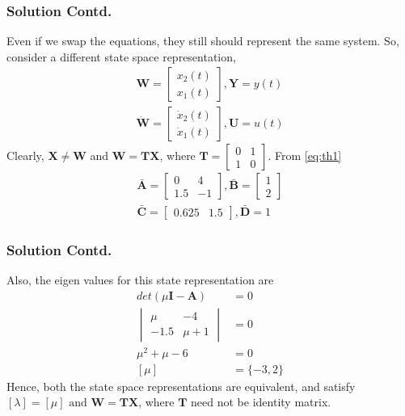 \documentclass{beamer}
\renewcommand{\vec}[1]{\mathbf{#1}}
\begin{document}
\begin{frame}
\frametitle{Solution Contd.}
Even if we swap the equations, they still should represent the same system. So, consider a different state space representation, 
\begin{align}
    \vec{W}=\begin{bmatrix}
    x_2(t)\\x_1(t)
    \end{bmatrix},\vec{Y}=y(t)\\
    \vec{\dot W}=\begin{bmatrix}
    \dot x_2(t)\\\dot x_1(t)
    \end{bmatrix},\vec{U}=u(t)
\end{align}
Clearly, $\vec{X}\neq \vec{W}$ and $\vec{W}=\vec{T}\vec{X}$, where $\vec{T}=\begin{bmatrix}
0 & 1\\
1 & 0
\end{bmatrix}$. From \eqref{eq:th1}
\begin{align}
    \vec{\bar A}=\begin{bmatrix}
    0 & 4\\
    1.5 & -1
    \end{bmatrix},\vec{\bar B}=\begin{bmatrix}
    1\\
    2
    \end{bmatrix}\\
    \vec{\bar C}=\begin{bmatrix}
    0.625 & 1.5
    \end{bmatrix},\vec{\bar D}=1
\end{align}
\end{frame}

\begin{frame}
\frametitle{Solution Contd.}
Also, the eigen values for this state representation are
\begin{align}
    det(\mu \vec{I}-\vec{A})&=0\\
    \begin{vmatrix}
    \mu & -4\\
    -1.5 & \mu+1
    \end{vmatrix}&=0\\
    \mu^2+\mu-6&=0\\
    [\mu]&=\{-3,2\}
\end{align}
Hence, both the state space representations are equivalent, and satisfy $[\lambda]=[\mu] \text{ and } \vec{W}=\vec{T}\vec{X}$, where $\vec{T}$ need not be identity matrix.
\end{frame}
\end{document}
